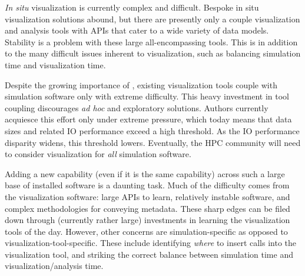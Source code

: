 \textit{In situ} visualization is currently complex and difficult.
Bespoke in situ visualization solutions abound, but there are presently
only a
couple visualization and analysis tools with \insitu{} APIs that
cater to a wide variety of data models.  Stability is a problem with
these large all-encompassing tools.  This is in addition to the many
difficult
issues inherent to \insitu{} visualization, such as balancing
simulation time and visualization time.

Despite the growing importance of \insitu{}, existing visualization
tools couple with simulation software only with extreme difficulty.
This heavy
investment in tool coupling discourages \textit{ad hoc} and exploratory
solutions.  Authors currently acquiesce this effort only under extreme
pressure, which today means that data sizes and related IO performance
exceed a high threshold.  As the IO performance disparity widens, this
threshold lowers.  Eventually, the HPC community will need to consider
\insitu{} visualization for \emph{all} simulation software.

Adding a new capability (even if it is the same capability) across such
a large base of installed software is a daunting task.  Much of the
difficulty comes from the visualization software: large APIs to learn,
relatively instable software, and complex methodologies for conveying
metadata.  These sharp edges can be filed down through (currently
rather large) investments in learning the visualization tools of the
day.  However, other concerns are simulation-specific as opposed to
visualization-tool-specific.  These include identifying \emph{where}
to insert calls into the visualization tool, and striking the correct
balance between simulation time and visualization/analysis time.



